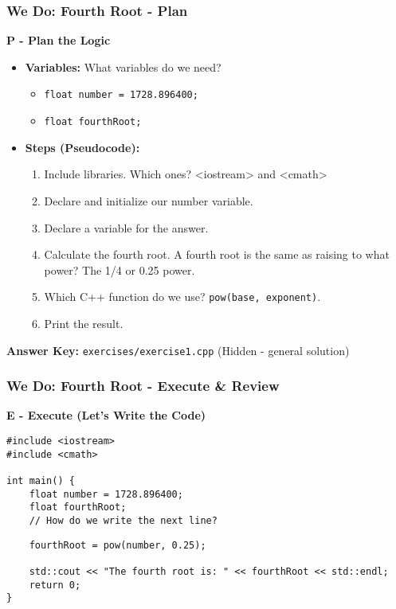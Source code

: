 \documentclass{beamer}
\begin{document}
\begin{frame}
\frametitle{We Do: Fourth Root - Plan}
\textbf{P - Plan the Logic}
\begin{itemize}
    \item \textbf{Variables:} What variables do we need? \pause
    \begin{itemize}
        \item \texttt{float number = 1728.896400;}
        \item \texttt{float fourthRoot;}
    \end{itemize} \pause
    \item \textbf{Steps (Pseudocode):}
    \begin{enumerate}
        \item Include libraries. Which ones? \alert{<iostream> and <cmath>} \pause
        \item Declare and initialize our number variable. \pause
        \item Declare a variable for the answer. \pause
        \item Calculate the fourth root. A fourth root is the same as raising to what power? \alert{The 1/4 or 0.25 power}. \pause
        \item Which C++ function do we use? \alert{\texttt{pow(base, exponent)}}. \pause
        \item Print the result.
    \end{enumerate}
\end{itemize}
\textbf{Answer Key:} \texttt{exercises/exercise1.cpp} (Hidden - general solution)
\end{frame}

\begin{frame}[fragile]
\frametitle{We Do: Fourth Root - Execute \& Review}
\textbf{E - Execute (Let's Write the Code)}
\begin{verbatim}
#include <iostream>
#include <cmath>

int main() {
    float number = 1728.896400;
    float fourthRoot;
    // How do we write the next line?
\end{verbatim}
\pause
\begin{verbatim}
    fourthRoot = pow(number, 0.25);

    std::cout << "The fourth root is: " << fourthRoot << std::endl;
    return 0;
}
\end{verbatim}

\end{frame}
\end{document}
